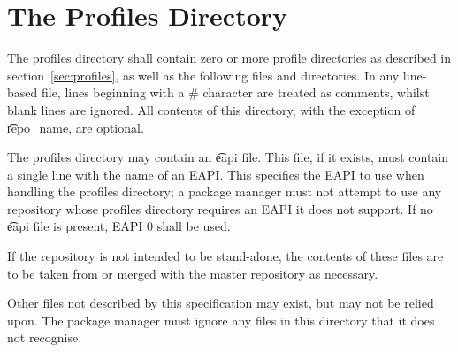 \section{The Profiles Directory}
\label{sec:profiles-dir}

The profiles directory shall contain zero or more profile directories
as described in section~\ref{sec:profiles}, as well as the following files
and directories. In any line-based file, lines beginning with a \#
character are treated as comments, whilst blank lines are ignored. All
contents of this directory, with the exception of \t{repo\_name}, are
optional.

The profiles directory may contain an \t{eapi} file. This file, if it exists, must contain a single
line with the name of an EAPI\@. This specifies the EAPI to use when handling the profiles
directory; a package manager must not attempt to use any repository whose profiles directory
requires an EAPI it does not support. If no \t{eapi} file is present, EAPI 0 shall be used.

If the repository is not intended to be stand-alone, the contents of these files are to be taken
from or merged with the master repository as necessary.

Other files not described by this specification may exist, but may not be relied upon. The package
manager must ignore any files in this directory that it does not recognise.

